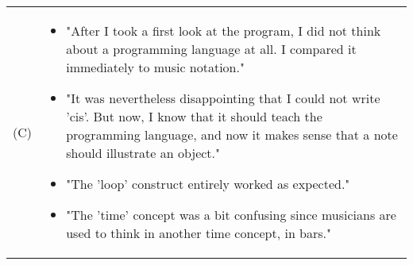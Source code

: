 \begin{longtable}{p{50pt}|p{320pt}}
(C)                 		& \begin{itemize}
\item "After I took a first look at the program, I did not think about a programming language at all. I compared it immediately to music notation."
\item "It was nevertheless disappointing that I could not write 'cis'. But now, I know that it should teach the programming language, and now it makes sense that a note should illustrate an object."
\item "The 'loop' construct entirely worked as expected."
\item "The 'time' concept was a bit confusing since musicians are used to think in another time concept, in bars."
\end{itemize} 
\end{longtable}
